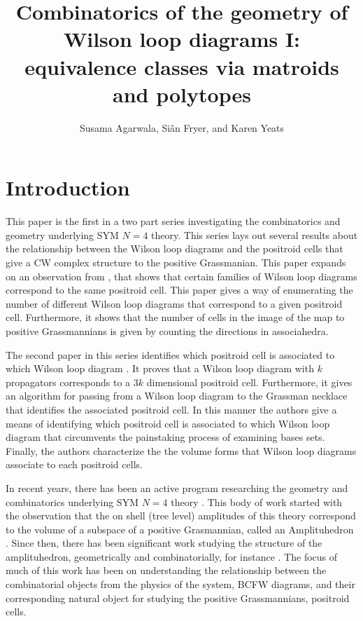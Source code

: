 \documentclass[11pt]{article}
\title{Combinatorics of the geometry of Wilson loop diagrams I: equivalence classes via matroids and polytopes}
\author{Susama Agarwala, Si\^an Fryer, and Karen Yeats}
\theoremstyle{remark}
\theoremstyle{definition}
\begin{document}
\maketitle



\section{Introduction}

This paper is the first in a two part series investigating the combinatorics and geometry underlying SYM $N=4$ theory. This series lays out several results about the relationship between the Wilson loop diagrams and the positroid cells that give a CW complex structure to the positive Grassmanian. This paper expands on an observation from \cite{wilsonloop}, that shows that certain families of Wilson loop diagrams correspond to the same positroid cell. This paper gives a way of enumerating the number of different Wilson loop diagrams that correspond to a given positroid cell. Furthermore, it shows that the number of cells in the image of the map to positive Grassmannians is given by counting the directions in associahedra. 

The second paper in this series identifies which positroid cell is associated to which Wilson loop diagram \cite{generalcombinatoricsI}. It proves that a Wilson loop diagram with $k$ propagators corresponds to a $3k$ dimensional positroid cell. Furthermore, it gives an algorithm for passing from a Wilson loop diagram to the Grassman necklace that identifies the associated positroid cell. In this manner the authors give a means of identifying which positroid cell is associated to which Wilson loop diagram that circumvents the painstaking process of examining bases sets. Finally, the authors characterize the the volume forms that Wilson loop diagrams associate to each positroid cells.

In recent years, there has been an active program researching the geometry and combinatorics underlying SYM $N=4$ theory \cite{wilsonloop, Arkani-Hamed:2013jha, Amplituhedronsquared, AmplituhedronDecomposition, galashinlam}. This body of work started with the observation that the on shell (tree level) amplitudes of this theory correspond to the volume of a subspace of a positive Grasmannian, called an Amplituhedron \cite{Arkani-Hamed:2013jha}. Since then, there has been significant work studying the structure of the amplituhedron, geometrically and combinatorially, for instance \cite{Arkani-Hamed:2013kca, arkani:2012nw, AmplituhedronDecomposition, galashinlam}. The focus of much of this work has been on understanding the relationship between the combinatorial objects from the physics of the system, BCFW diagrams, and their corresponding natural object for studying the positive Grassmannians, positroid cells. 
\end{document}
